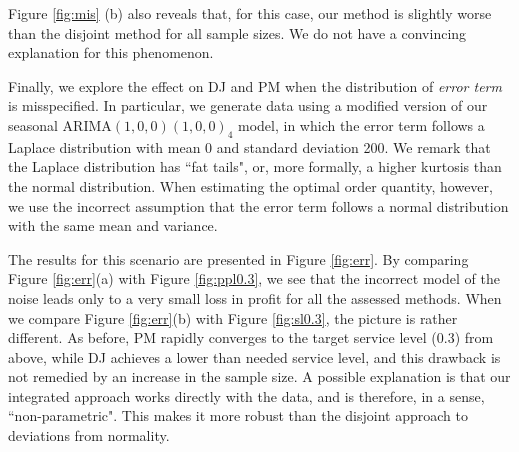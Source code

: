 \documentclass{article}
\begin{document}
Figure \ref{fig:mis} (b) also reveals that, for this case, our method is slightly worse than the disjoint method for all sample sizes. We do not have a convincing explanation for this phenomenon.

Finally, we explore the effect on DJ and PM when the distribution of \emph{error term} is misspecified. In particular, we generate data using a modified version of our seasonal ARIMA$(1,0,0)(1,0,0)_4$ model, in which the error term follows a Laplace distribution with mean 0 and standard deviation 200. We remark that the Laplace distribution has ``fat tails", or, more formally, a higher kurtosis than the normal distribution. When estimating the optimal order quantity, however, we use the incorrect assumption that the error term follows a normal distribution with the same mean and variance.

The results for this scenario are presented in Figure \ref{fig:err}.
By comparing Figure \ref{fig:err}(a) with Figure \ref{fig:ppl0.3}, we see that the incorrect model of the noise leads only to a very small loss in profit for all the assessed methods. When we compare Figure \ref{fig:err}(b) with Figure \ref{fig:sl0.3}, the picture is rather different. As before, PM rapidly converges to the target service level (0.3) from above, while DJ achieves a lower than needed service level, and this drawback is not remedied by an increase in the sample size. A possible explanation is that our integrated approach works directly with the data, and is therefore, in a sense, ``non-parametric". This makes it more robust than the disjoint approach to deviations from normality.
\end{document}
